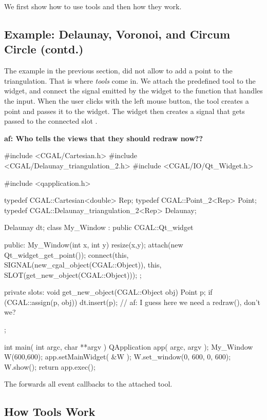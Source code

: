 We first show how to use tools and then how they work.

\subsection{Example: Delaunay, Voronoi, and Circum Circle (contd.)}

The example in the previous section, did not allow to add a point to the triangulation.
That is where {\em  tools} come in. We attach the predefined tool 
to the widget, and connect the signal emitted by the widget to the function that 
handles the input.  When the user clicks with the left mouse button, the tool creates
a point and passes it to the widget. The widget then creates a signal that gets passed
to the connected slot .

{\bf af: Who tells the views that they should redraw now??} 

\begin{ccExampleCode}
#include <CGAL/Cartesian.h>
#include <CGAL/Delaunay_triangulation_2.h>
#include <CGAL/IO/Qt_Widget.h>

#include <qapplication.h>

typedef CGAL::Cartesian<double>		    Rep;
typedef CGAL::Point_2<Rep>		    Point;
typedef CGAL::Delaunay_triangulation_2<Rep> Delaunay;

Delaunay dt;
class My_Window : public CGAL::Qt_widget {
public:
  My_Window(int x, int y){
    resize(x,y);
    attach(new Qt_widget_get_point());
    connect(this, SIGNAL(new_cgal_object(CGAL::Object)), 
            this, SLOT(get_new_object(CGAL::Object)));
  };
   
private slots:
  void get_new_object(CGAL::Object obj)
  {
    Point p;
    if (CGAL::assign(p, obj)) { 
      dt.insert(p);
    }
    // af: I guess here we need a redraw(), don't we?
  }
};

int main( int argc, char **argv )
{
    QApplication app( argc, argv );
    My_Window W(600,600);
    app.setMainWidget( &W );
    W.set_window(0, 600, 0, 600);
    W.show();
    return app.exec();
}
\end{ccExampleCode}




The  forwards all event callbacks to the attached tool.


\subsection{How Tools Work}

